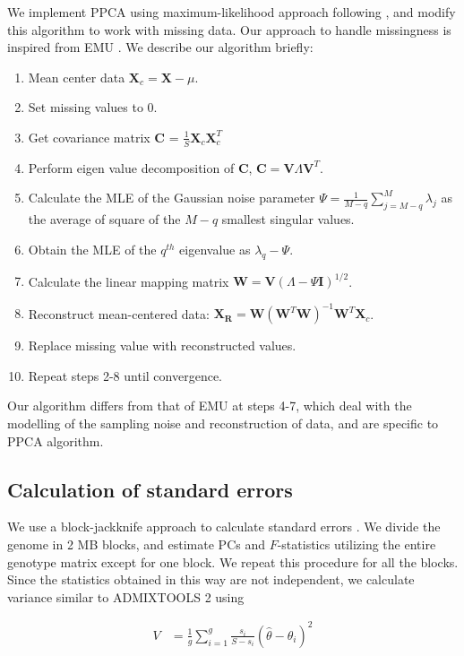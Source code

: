 \documentclass[12pt]{article}
\newcommand{\BW}{\mathbf{W}}
\newcommand{\BI}{\mathbf{I}}
\newcommand{\MX}{\mathbf{X}}
\begin{document}
We implement PPCA using maximum-likelihood approach following \cite{tipping_probabilistic_1999-1}, and modify this algorithm to work with missing data. Our approach to handle missingness is inspired from EMU \citep{meisner_large-scale_2021}. We describe our algorithm briefly:
\begin{enumerate}
    \item Mean center data $\MX_c = \MX - \mu$.
    \item Set missing values to 0.
    \item Get covariance matrix $\mathbf{C}$ = $\frac{1}{S} \MX_c\MX_c^T$
    \item Perform eigen value decomposition of $\mathbf{C}$, $\mathbf{C} = \mathbf{V}\Lambda\mathbf{V}^T$.
    \item Calculate the MLE of the Gaussian noise parameter $\Psi = \frac{1}{M-q} \sum_{j=M-q}^ M \lambda_j$ as the average of square of the $M-q$ smallest singular values.
    \item Obtain the MLE of the $q^{th}$ eigenvalue as $\lambda_q - \Psi$.
    \item Calculate the linear mapping matrix $\BW = \mathbf{V} (\Lambda - \Psi\BI)^{1/2}$.
    \item Reconstruct mean-centered data: $\mathbf{X_R} = \BW(\BW^T\BW)^{-1}\BW^T\MX_c$.
    \item Replace missing value with reconstructed values.
    \item Repeat steps 2-8 until convergence.
\end{enumerate}

Our algorithm differs from that of EMU at steps 4-7, which deal with the modelling of the sampling noise and reconstruction of data, and are specific to PPCA algorithm.

\subsection{Calculation of standard errors}

We use a block-jackknife approach to calculate standard errors \citep{kunsch_jackknife_1989, maier_limits_2022, patterson_modication_2020}. We divide the genome in 2 MB blocks, and estimate PCs and $F$-statistics utilizing the entire genotype matrix except for one block. We repeat this procedure for all the blocks. Since the statistics obtained in this way are not independent, we calculate variance similar to ADMIXTOOLS 2 using 

\begin{align}\label{eq:bjk_var}
V &= \frac{1}{g} \sum_{i=1}^g \frac{s_i}{S-s_i} (\hat{\theta} - \theta_i)^2
\end{align}
\end{document}
